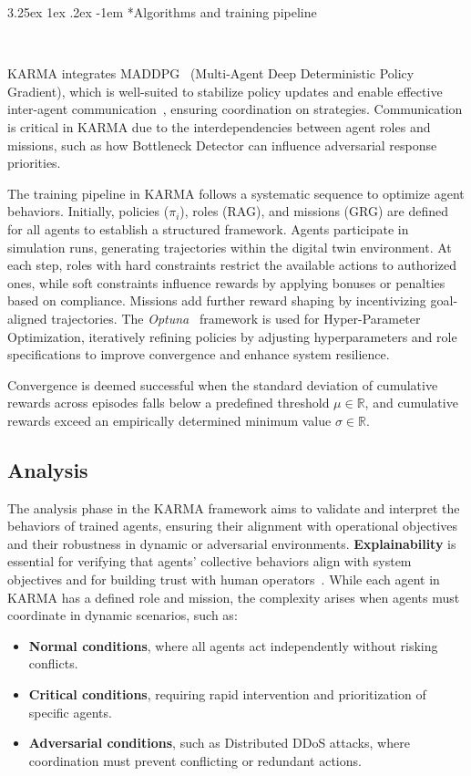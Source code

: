 \documentclass[conference]{IEEEtran}
\makeatletter
\renewcommand\paragraph{\@startsection{paragraph}{5}{\z@}%
  {3.25ex \@plus1ex \@minus.2ex}%
  {-1em}%
  {\normalfont\normalsize\bfseries}}
\makeatother
\begin{document}
\paragraph*{Algorithms and training pipeline}

\

KARMA integrates MADDPG~\cite{lowe2017multi} (Multi-Agent Deep Deterministic Policy Gradient), which is well-suited to stabilize policy updates and enable effective inter-agent communication~\cite{lowe2017multi}, ensuring coordination on strategies. Communication is critical in KARMA due to the interdependencies between agent roles and missions, such as how Bottleneck Detector can influence adversarial response priorities.

The training pipeline in KARMA follows a systematic sequence to optimize agent behaviors. Initially, policies (\(\pi_i\)), roles (RAG), and missions (GRG) are defined for all agents to establish a structured framework. Agents participate in simulation runs, generating trajectories within the digital twin environment. At each step, roles with hard constraints restrict the available actions to authorized ones, while soft constraints influence rewards by applying bonuses or penalties based on compliance. Missions add further reward shaping by incentivizing goal-aligned trajectories. The \textit{Optuna}~\cite{akiba2019optuna} framework is used for Hyper-Parameter Optimization, iteratively refining policies by adjusting hyperparameters and role specifications to improve convergence and enhance system resilience.

Convergence is deemed successful when the standard deviation of cumulative rewards across episodes falls below a predefined threshold $\mu \in \mathbb{R}$, and cumulative rewards exceed an empirically determined minimum value $\sigma \in \mathbb{R}$.


\subsection{Analysis}
\label{sec:analysis}

The analysis phase in the KARMA framework aims to validate and interpret the behaviors of trained agents, ensuring their alignment with operational objectives and their robustness in dynamic or adversarial environments. \textbf{Explainability} is essential for verifying that agents' collective behaviors align with system objectives and for building trust with human operators~\cite{biran2017explanation, guidotti2018survey}. While each agent in KARMA has a defined role and mission, the complexity arises when agents must coordinate in dynamic scenarios, such as:
\begin{itemize}
    \item \textbf{Normal conditions}, where all agents act independently without risking conflicts.
    \item \textbf{Critical conditions}, requiring rapid intervention and prioritization of specific agents.
    \item \textbf{Adversarial conditions}, such as Distributed DDoS attacks, where coordination must prevent conflicting or redundant actions.
\end{itemize}
\end{document}
